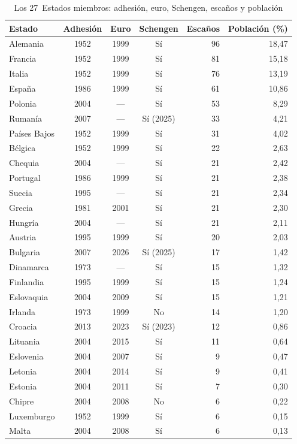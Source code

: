 \documentclass[11pt]{article}
\begin{document}
\begin{table}[H]
\centering
\caption{Los 27~Estados miembros: adhesión, euro, Schengen, escaños y población}\label{tab:estados}
\small
\begin{tabular}{lcccrr}
\hline
\textbf{Estado} & \textbf{Adhesión} & \textbf{Euro} & \textbf{Schengen} & \textbf{Escaños} & \textbf{Población (\%)}\\
\hline
Alemania & 1952 & 1999 & Sí & 96 & 18,47\\
Francia & 1952 & 1999 & Sí & 81 & 15,18\\
Italia & 1952 & 1999 & Sí & 76 & 13,19\\
España & 1986 & 1999 & Sí & 61 & 10,86\\
Polonia & 2004 & --- & Sí & 53 & 8,29\\
Rumanía & 2007 & --- & Sí (2025) & 33 & 4,21\\
Países Bajos & 1952 & 1999 & Sí & 31 & 4,02\\
Bélgica & 1952 & 1999 & Sí & 22 & 2,63\\
Chequia & 2004 & --- & Sí & 21 & 2,42\\
Portugal & 1986 & 1999 & Sí & 21 & 2,38\\
Suecia & 1995 & --- & Sí & 21 & 2,34\\
Grecia & 1981 & 2001 & Sí & 21 & 2,30\\
Hungría & 2004 & --- & Sí & 21 & 2,11\\
Austria & 1995 & 1999 & Sí & 20 & 2,03\\
Bulgaria & 2007 & 2026 & Sí (2025) & 17 & 1,42\\
Dinamarca & 1973 & --- & Sí & 15 & 1,32\\
Finlandia & 1995 & 1999 & Sí & 15 & 1,24\\
Eslovaquia & 2004 & 2009 & Sí & 15 & 1,21\\
Irlanda & 1973 & 1999 & No & 14 & 1,20\\
Croacia & 2013 & 2023 & Sí (2023) & 12 & 0,86\\
Lituania & 2004 & 2015 & Sí & 11 & 0,64\\
Eslovenia & 2004 & 2007 & Sí & 9 & 0,47\\
Letonia & 2004 & 2014 & Sí & 9 & 0,41\\
Estonia & 2004 & 2011 & Sí & 7 & 0,30\\
Chipre & 2004 & 2008 & No & 6 & 0,22\\
Luxemburgo & 1952 & 1999 & Sí & 6 & 0,15\\
Malta & 2004 & 2008 & Sí & 6 & 0,13\\
\hline
\end{tabular}
\end{table}
\end{document}
